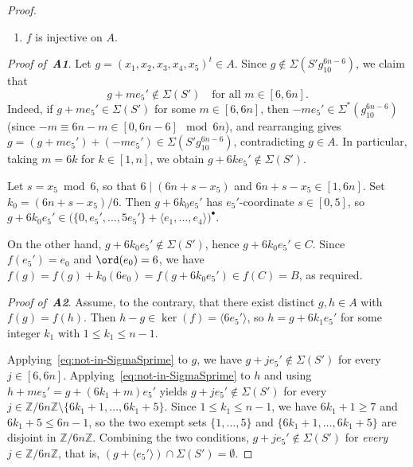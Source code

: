 \documentclass[a4paper, 10pt]{amsart}
\theoremstyle{plain}
\theoremstyle{definition}
\numberwithin{equation}{section}
\begin{document}
{\begin{proof}
\begin{enumerate}
\item[{\bf A2.}\,] $f$ is injective on $A$.
\end{enumerate}

\smallskip

{\it Proof of \,{\bf A1}}. Let $g = (x_1, x_2, x_3, x_4, x_5)^t \in A$. Since
	$g \notin \Sigma(S' g_{10}^{6n-6})$, we claim that
	\begin{equation}\label{eq:not-in-SigmaSprime}
	g + m e_5' \notin \Sigma(S')
	\quad \text{for all } m \in [6, 6n].
	\end{equation}
	Indeed, if $g + m e_5' \in \Sigma(S')$ for some $m \in [6, 6n]$, then
	$-m e_5' \in \Sigma^*(g_{10}^{6n-6})$ (since
	$-m \equiv 6n - m \in [0, 6n-6] \mod{6n}$), and rearranging gives
	$g = (g + m e_5') + (-m e_5') \in \Sigma(S' g_{10}^{6n-6})$,
	contradicting $g \in A$. In particular, taking $m = 6k$ for
	$k \in [1,n]$, we obtain $g + 6k e_5' \notin \Sigma(S')$.
	
	Let $s = x_5 \bmod 6$, so that $6 \mid (6n + s - x_5)$ and
	$6n + s - x_5 \in [1, 6n]$. Set $k_0 = (6n + s - x_5)/6$. Then
	$g + 6k_0 e_5'$ has $e_5'$-coordinate $s \in [0, 5]$, so
	$g + 6k_0 e_5' \in
	\bigl(\{0, e_5', \dots, 5e_5'\} + \langle e_1, \dots, e_4\rangle
	\bigr)^{\bullet}.$
	
	On the other hand, $g + 6k_0 e_5' \notin \Sigma(S')$,
	hence $g + 6k_0 e_5' \in C$. Since $f(e_5') = e_0$ and
	$\ord(e_0) = 6$, we have
	$f(g) = f(g) + k_0 (6 e_0) = f(g + 6k_0 e_5') \in f(C) = B$,
	as required.
	
{\it Proof of \,{\bf A2}}.	 Assume, to the contrary, that there exist distinct $g, h \in A$ with
	$f(g) = f(h)$. Then $h - g \in \ker(f) = \langle 6 e_5' \rangle$, so
	$h = g + 6k_1 e_5'$ for some integer $k_1$ with $1 \leq k_1 \leq n-1$.
	
	Applying~\eqref{eq:not-in-SigmaSprime} to $g$, we have
	$g + j e_5' \notin \Sigma(S')$ for every
	$j \in [6,6n]$.
	Applying~\eqref{eq:not-in-SigmaSprime} to $h$ and using
	$h + m e_5' = g + (6k_1 + m) e_5'$ yields
	$g + j e_5' \notin \Sigma(S')$ for every
	$j \in \mathbb{Z}/6n\mathbb{Z} \setminus \{6k_1 + 1, \dots, 6k_1 + 5\}$.
	Since $1 \leq k_1 \leq n-1$, we have $6k_1 + 1 \geq 7$ and
	$6k_1 + 5 \leq 6n - 1$, so the two exempt sets $\{1, \dots, 5\}$ and
	$\{6k_1 + 1, \dots, 6k_1 + 5\}$ are disjoint in $\mathbb{Z}/6n\mathbb{Z}$.
	Combining the two conditions, $g + j e_5' \notin \Sigma(S')$ for
	\emph{every} $j \in \mathbb{Z}/6n\mathbb{Z}$, that is, $(g + \langle e_5' \rangle) \cap \Sigma(S') = \emptyset.$
	

\end{proof}}
\end{document}
